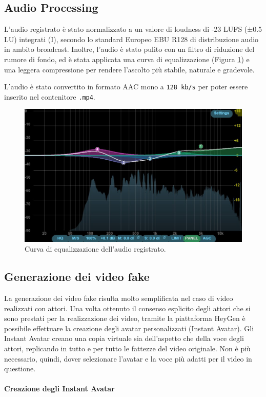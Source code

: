 \subsection{Audio Processing}

L'audio registrato è stato normalizzato a un valore di loudness di -23 LUFS (±0.5 LU) integrati (I), secondo lo standard Europeo EBU R128 di distribuzione audio in ambito broadcast. Inoltre, l'audio è stato pulito con un filtro di riduzione del rumore di fondo, ed è stata applicata una curva di equalizzazione (Figura \ref{fig:eq_curve}) e una leggera compressione per rendere l'ascolto più stabile, naturale e gradevole.

L'audio è stato convertito in formato AAC mono a \verb|128 kb/s| per poter essere inserito nel contenitore \verb|.mp4|.

\begin{figure}[t]
    \centering
    \includegraphics[width=0.62\linewidth]{images/eq_curve}
    \caption{Curva di equalizzazione dell'audio registrato.}
    \label{fig:eq_curve}
\end{figure}

\subsection{Generazione dei video fake}

La generazione dei video fake risulta molto semplificata nel caso di video realizzati con attori. Una volta ottenuto il consenso esplicito degli attori che si sono prestati per la realizzazione dei video, tramite la piattaforma HeyGen è possibile effettuare la creazione degli avatar personalizzati (Instant Avatar). Gli Instant Avatar creano una copia virtuale sia dell'aspetto che della voce degli attori, replicando in tutto e per tutto le fattezze del video originale. Non è più necessario, quindi, dover selezionare l'avatar e la voce più adatti per il video in questione.

\paragraph{Creazione degli Instant Avatar}

